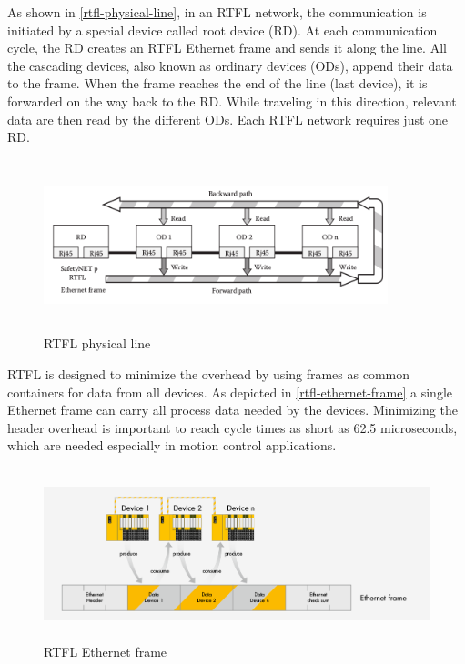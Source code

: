 As shown in \autoref{rtfl-physical-line}, in an \ac{RTFL} network, the communication is initiated by a special device called root device (RD). At each communication
cycle, the RD creates an \ac{RTFL} Ethernet frame and sends it along the line. All the cascading devices, also known as ordinary devices (ODs), append their data to the frame. When the frame reaches the end
of the line (last device), it is forwarded on the way back to the RD. While traveling in this direction, relevant
data are then read by the different ODs. Each \ac{RTFL} network requires just one RD.

\begin{figure}[H]
\centering
\includegraphics[width=10cm,height=5cm]{figures/safetynetp/rtfl-physical-line.png}
\caption{RTFL physical line}\label{rtfl-physical-line}
\end{figure}

\ac{RTFL} is designed to minimize the overhead by using frames as common containers for data from all devices.
As depicted in \autoref{rtfl-ethernet-frame} a single Ethernet frame can carry all process data needed by the devices. Minimizing the header overhead is important to reach
cycle times as short as 62.5 microseconds, which are needed especially in motion control applications.

\begin{figure}[H]
\centering
\includegraphics[width=15cm,height=5cm]{figures/safetynetp/rtfl-ethernet-frame.png}
\caption{RTFL Ethernet frame}\label{rtfl-ethernet-frame}
\end{figure}

